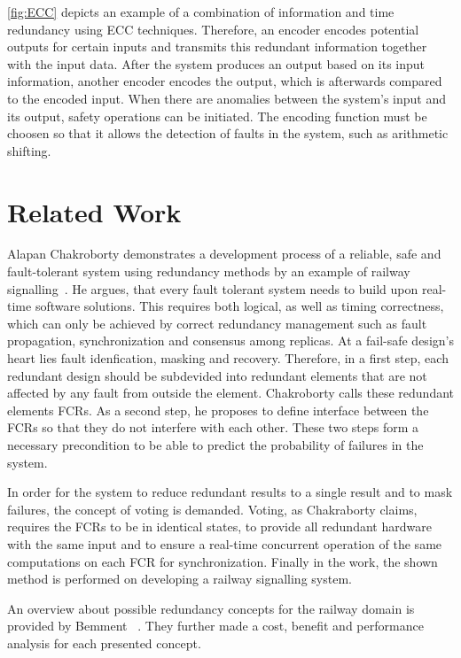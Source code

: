 \autoref{fig:ECC} depicts an example of a combination of information and time redundancy using \gls*{ECC} techniques.
Therefore, an encoder encodes potential outputs for certain inputs and transmits this redundant information together with the input data.
After the system produces an output based on its input information, another encoder encodes the output, which is afterwards compared to the encoded input.
When there are anomalies between the system's input and its output, safety operations can be initiated.
The encoding function must be choosen so that it allows the detection of faults in the system, such as arithmetic shifting.

\section{Related Work}

Alapan Chakroborty demonstrates a development process of a reliable, safe and fault-tolerant system using redundancy methods by an example of railway signalling~\cite{ChakrabortyFaultTolerantRailway}.
He argues, that every fault tolerant system needs to build upon real-time software solutions.
This requires both logical, as well as timing correctness, which can only be achieved by correct redundancy management such as fault propagation, synchronization and consensus among replicas.
At a fail-safe design's heart lies fault idenfication, masking and recovery.
Therefore, in a first step, each redundant design should be subdevided into redundant elements that are not affected by any fault from outside the element.
Chakroborty calls these redundant elements \glspl*{FCR}.
As a second step, he proposes to define interface between the \glspl*{FCR} so that they do not interfere with each other.
These two steps form a necessary precondition to be able to predict the probability of failures in the system.

In order for the system to reduce redundant results to a single result and to mask failures, the concept of voting is demanded.
Voting, as Chakraborty claims, requires the \glspl*{FCR} to be in identical states, to provide all redundant hardware with the same input and to ensure a real-time concurrent operation of the same computations on each \gls*{FCR} for synchronization.
Finally in the work, the shown method is performed on developing a railway signalling system.

An overview about possible redundancy concepts for the railway domain is provided by Bemment \etal~\cite{BemmentEvaluationOfRedundancy}.
They further made a cost, benefit and performance analysis for each presented concept.
\\


